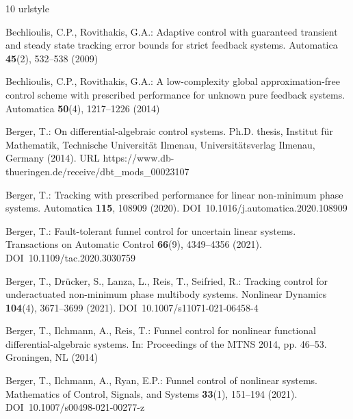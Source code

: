 \documentclass[ envcountsect, envcountsame]{svjour3}
\begin{document}
\begin{thebibliography}{10}
\providecommand{\url}[1]{{#1}}
\providecommand{\urlprefix}{URL }
\expandafter\ifx\csname urlstyle\endcsname\relax
  \providecommand{\doi}[1]{DOI~\discretionary{}{}{}#1}\else
  \providecommand{\doi}{DOI~\discretionary{}{}{}\begingroup
  \urlstyle{rm}\Url}\fi

Bechlioulis, C.P., Rovithakis, G.A.: Adaptive control with guaranteed transient
  and steady state tracking error bounds for strict feedback systems.
\newblock Automatica \textbf{45}(2), 532--538 (2009)

Bechlioulis, C.P., Rovithakis, G.A.: A low-complexity global approximation-free
  control scheme with prescribed performance for unknown pure feedback systems.
\newblock Automatica \textbf{50}(4), 1217--1226 (2014)

Berger, T.: On differential-algebraic control systems.
\newblock Ph.D. thesis, Institut f{\"u}r Mathematik, Technische Universit{\"a}t
  Ilmenau, Universit{\"a}tsverlag Ilmenau, Germany (2014).
\newblock
  \urlprefix\url{https://www.db-thueringen.de/receive/dbt_mods_00023107}

Berger, T.: Tracking with prescribed performance for linear non-minimum phase
  systems.
\newblock Automatica \textbf{115}, 108909 (2020).
\newblock \doi{10.1016/j.automatica.2020.108909}

Berger, T.: Fault-tolerant funnel control for uncertain linear systems.
 Transactions on Automatic Control \textbf{66}(9), 4349--4356
  (2021).
\newblock \doi{10.1109/tac.2020.3030759}

Berger, T., Drücker, S., Lanza, L., Reis, T., Seifried, R.: Tracking control
  for underactuated non-minimum phase multibody systems.
\newblock Nonlinear Dynamics \textbf{104}(4), 3671--3699 (2021).
\newblock \doi{10.1007/s11071-021-06458-4}

Berger, T., Ilchmann, A., Reis, T.: Funnel control for nonlinear functional
  differential-algebraic systems.
\newblock In: Proceedings of the MTNS 2014, pp. 46--53. Groningen, NL (2014)

Berger, T., Ilchmann, A., Ryan, E.P.: Funnel control of nonlinear systems.
\newblock Mathematics of Control, Signals, and Systems \textbf{33}(1), 151--194
  (2021).
\newblock \doi{10.1007/s00498-021-00277-z}


\end{thebibliography}
\end{document}
